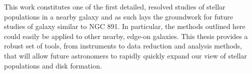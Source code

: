 This work constitutes one of the first detailed, resolved studies of
stellar populations in a nearby galaxy and as such lays the groundwork
for future studies of galaxy similar to NGC 891. In particular, the
methods outlined here could easily be applied to other nearby, edge-on
galaxies. This thesis provides a robust set of tools, from instruments
to data reduction and analysis methods, that will allow future
astronomers to rapidly quickly expand our view of stellar populations
and disk formation.

\clearpage
{} %




